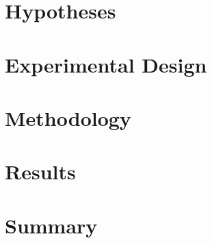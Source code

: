 \section{Hypotheses}

\section{Experimental Design}

\section{Methodology}

\section{Results}

\section{Summary}